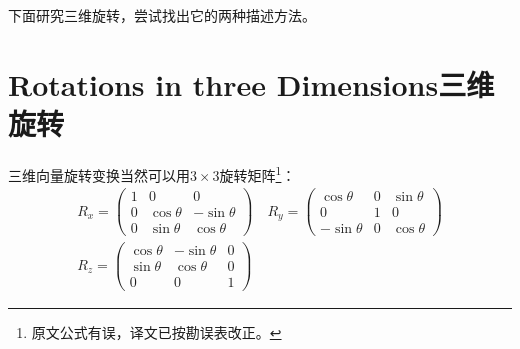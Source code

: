 下面研究三维旋转，尝试找出它的两种描述方法。

\section[三维旋转]{Rotations in three Dimensions\quad 三维旋转}
\label{sec3.3}
三维向量旋转变换当然可以用$3 \times 3$旋转矩阵\footnote{原文公式有误，译文已按勘误表改正。}：
\begin{align}
R_x =
	\begin{pmatrix}
		1 & 0 & 0 \\
		0 & \cos \theta & -\sin \theta \\
		0 & \sin \theta & \cos \theta
	\end{pmatrix}
\quad
R_y =
	\begin{pmatrix}
		\cos \theta & 0 & \sin \theta \\
		0 & 1 & 0 \\
		-\sin \theta & 0 & \cos \theta
	\end{pmatrix}
\nonumber \\
\label{equ3.23}
R_z =
	\begin{pmatrix}
		\cos \theta & -\sin \theta & 0 \\
		\sin \theta & \cos \theta & 0 \\
		0 & 0 & 1
	\end{pmatrix}
\end{align}

